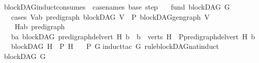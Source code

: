 \begin{isabellebody}
%
\endisadelimproof
\isanewline
{}\isamarkupfalse%
\ blockDAG{\isacharunderscore}{\kern0pt}induct{\isacharbrackleft}{\kern0pt}consumes\ {}{\isacharcomma}{\kern0pt}\ case{\isacharunderscore}{\kern0pt}names\ base\ step{\isacharbrackright}{\kern0pt}{\isacharcolon}{\kern0pt}\isanewline
\ \ \ fund{\isacharcolon}{\kern0pt}\ {\isachardoublequoteopen}blockDAG\ G{\isachardoublequoteclose}\isanewline
\ \ \ cases{\isacharcolon}{\kern0pt}\ {\isachardoublequoteopen}{\isasymAnd}V{\isacharcolon}{\kern0pt}{\isacharcolon}{\kern0pt}{\isacharparenleft}{\kern0pt}{\isacharprime}{\kern0pt}a{\isacharcomma}{\kern0pt}{\isacharprime}{\kern0pt}b{\isacharparenright}{\kern0pt}\ pre{\isacharunderscore}{\kern0pt}digraph{\isachardot}{\kern0pt}\ blockDAG\ V\ {\isasymLongrightarrow}\ P\ {\isacharparenleft}{\kern0pt}blockDAG{\isachardot}{\kern0pt}gen{\isacharunderscore}{\kern0pt}graph\ V{\isacharparenright}{\kern0pt}{\isachardoublequoteclose}\isanewline
\ \ \ \ {\isachardoublequoteopen}{\isasymAnd}H{\isacharcolon}{\kern0pt}{\isacharcolon}{\kern0pt}{\isacharparenleft}{\kern0pt}{\isacharprime}{\kern0pt}a{\isacharcomma}{\kern0pt}{\isacharprime}{\kern0pt}b{\isacharparenright}{\kern0pt}\ pre{\isacharunderscore}{\kern0pt}digraph{\isachardot}{\kern0pt}\ \isanewline
\ \ \ {\isacharparenleft}{\kern0pt}{\isasymAnd}b{\isacharcolon}{\kern0pt}{\isacharcolon}{\kern0pt}{\isacharprime}{\kern0pt}a{\isachardot}{\kern0pt}\ blockDAG\ {\isacharparenleft}{\kern0pt}pre{\isacharunderscore}{\kern0pt}digraph{\isachardot}{\kern0pt}del{\isacharunderscore}{\kern0pt}vert\ H\ b{\isacharparenright}{\kern0pt}\ {\isasymLongrightarrow}\ b\ {\isasymin}\ verts\ H\ {\isasymLongrightarrow}\ P{\isacharparenleft}{\kern0pt}pre{\isacharunderscore}{\kern0pt}digraph{\isachardot}{\kern0pt}del{\isacharunderscore}{\kern0pt}vert\ H\ b{\isacharparenright}{\kern0pt}{\isacharparenright}{\kern0pt}\isanewline
\ \ {\isasymLongrightarrow}\ {\isacharparenleft}{\kern0pt}blockDAG\ H\ {\isasymLongrightarrow}\ P\ H{\isacharparenright}{\kern0pt}{\isachardoublequoteclose}\isanewline
\ \ \ {\isachardoublequoteopen}P\ G{\isachardoublequoteclose}\isanewline
%
\isadelimproof
%
\endisadelimproof
%
\isatagproof
{}\isamarkupfalse%
{\isacharparenleft}{\kern0pt}induct{\isacharunderscore}{\kern0pt}tac\ G\ rule{\isacharcolon}{\kern0pt}blockDAG{\isacharunderscore}{\kern0pt}nat{\isacharunderscore}{\kern0pt}induct{\isacharparenright}{\kern0pt}\ \isanewline
\ \ \isamarkupfalse%
\ {\isachardoublequoteopen}blockDAG\ G{\isachardoublequoteclose}\ \isamarkupfalse%

\end{isabellebody}
